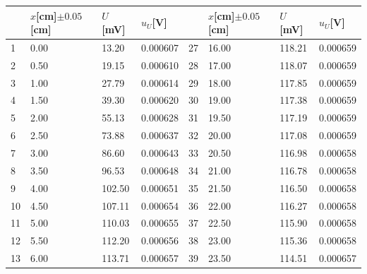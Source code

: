 \documentclass[12pt, a4paper]{article}
\begin{document}
\begin{table}[H]
	\begin{center}
	\begin{tabular}{|l|l|l|l|l|l|l|l|}
	\hline
	   & $x${[}cm{]}$\pm 0.05${[}cm{]} & $U${[}mV{]} & $u_U${[}V{]} &    & $x${[}cm{]}$\pm 0.05${[}cm{]} & $U${[}mV{]} & $u_U${[}V{]} \\ \hline
	1  & 0.00                          & 13.20       & 0.000607     & 27 & 16.00                         & 118.21      & 0.000659     \\ \hline
	2  & 0.50                          & 19.15       & 0.000610     & 28 & 17.00                         & 118.07      & 0.000659     \\ \hline
	3  & 1.00                          & 27.79       & 0.000614     & 29 & 18.00                         & 117.85      & 0.000659     \\ \hline
	4  & 1.50                          & 39.30       & 0.000620     & 30 & 19.00                         & 117.38      & 0.000659     \\ \hline
	5  & 2.00                          & 55.13       & 0.000628     & 31 & 19.50                         & 117.19      & 0.000659     \\ \hline
	6  & 2.50                          & 73.88       & 0.000637     & 32 & 20.00                         & 117.08      & 0.000659     \\ \hline
	7  & 3.00                          & 86.60       & 0.000643     & 33 & 20.50                         & 116.98      & 0.000658     \\ \hline
	8  & 3.50                          & 96.53       & 0.000648     & 34 & 21.00                         & 116.78      & 0.000658     \\ \hline
	9  & 4.00                          & 102.50      & 0.000651     & 35 & 21.50                         & 116.50      & 0.000658     \\ \hline
	10 & 4.50                          & 107.11      & 0.000654     & 36 & 22.00                         & 116.27      & 0.000658     \\ \hline
	11 & 5.00                          & 110.03      & 0.000655     & 37 & 22.50                         & 115.90      & 0.000658     \\ \hline
	12 & 5.50                          & 112.20      & 0.000656     & 38 & 23.00                         & 115.36      & 0.000658     \\ \hline
	13 & 6.00                          & 113.71      & 0.000657     & 39 & 23.50                         & 114.51      & 0.000657     \\ \hline

\end{tabular}
\end{center}
\end{table}
\end{document}
